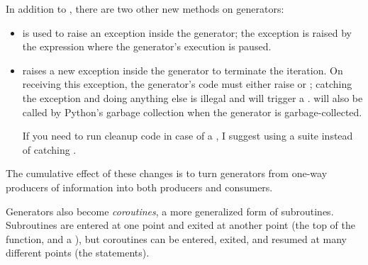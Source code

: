 \documentclass{howto}
\begin{document}
In addition to , there are two other new methods on
generators:

\begin{itemize}

  \item {} is used to raise an exception inside the
  generator; the exception is raised by the  expression
  where the generator's execution is paused.

  \item {} raises a new 
  exception inside the generator to terminate the iteration.  
  On receiving this
  exception, the generator's code must either raise
   or ; catching the 
  exception and doing anything else is illegal and will trigger
  a .   will also be called by 
  Python's garbage collection when the generator is garbage-collected.

  If you need to run cleanup code in case of a ,
  I suggest using a  suite instead of 
  catching .

\end{itemize}

The cumulative effect of these changes is to turn generators from
one-way producers of information into both producers and consumers.

Generators also become \emph{coroutines}, a more generalized form of
subroutines.  Subroutines are entered at one point and exited at
another point (the top of the function, and a ), but coroutines can be entered, exited, and resumed at
many different points (the  statements).


\begin{seealso}




\end{seealso}
\end{document}
